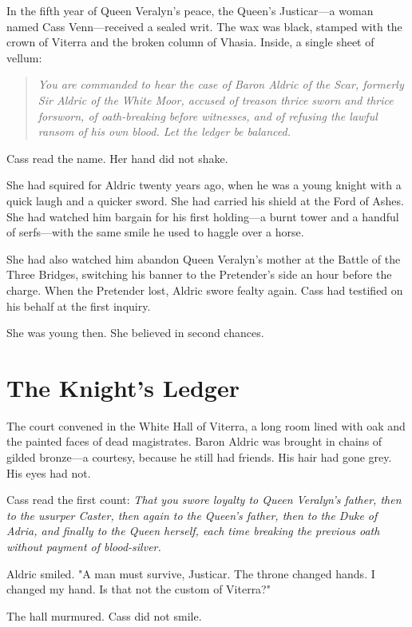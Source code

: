 \documentclass[11pt,twoside]{book}
\begin{document}
In the fifth year of Queen Veralyn's peace, the Queen's Justicar---a woman named Cass Venn---received a sealed writ. The wax was black, stamped with the crown of Viterra and the broken column of Vhasia. Inside, a single sheet of vellum:

\begin{quote}
\textit{You are commanded to hear the case of Baron Aldric of the Scar, formerly Sir Aldric of the White Moor, accused of treason thrice sworn and thrice forsworn, of oath-breaking before witnesses, and of refusing the lawful ransom of his own blood. Let the ledger be balanced.}
\end{quote}

Cass read the name. Her hand did not shake.

She had squired for Aldric twenty years ago, when he was a young knight with a quick laugh and a quicker sword. She had carried his shield at the Ford of Ashes. She had watched him bargain for his first holding---a burnt tower and a handful of serfs---with the same smile he used to haggle over a horse.

She had also watched him abandon Queen Veralyn's mother at the Battle of the Three Bridges, switching his banner to the Pretender's side an hour before the charge. When the Pretender lost, Aldric swore fealty again. Cass had testified on his behalf at the first inquiry.

She was young then. She believed in second chances.

\section{The Knight's Ledger}

The court convened in the White Hall of Viterra, a long room lined with oak and the painted faces of dead magistrates. Baron Aldric was brought in chains of gilded bronze---a courtesy, because he still had friends. His hair had gone grey. His eyes had not.

Cass read the first count: \textit{That you swore loyalty to Queen Veralyn's father, then to the usurper Caster, then again to the Queen's father, then to the Duke of Adria, and finally to the Queen herself, each time breaking the previous oath without payment of blood-silver.}

Aldric smiled. "A man must survive, Justicar. The throne changed hands. I changed my hand. Is that not the custom of Viterra?"

The hall murmured. Cass did not smile.
\end{document}
